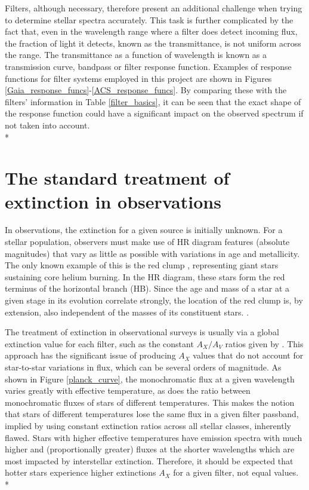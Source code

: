 \documentclass[12pt, a4paper]{report}
\begin{document}
Filters, although necessary, therefore present an additional challenge when trying to determine stellar spectra accurately. This task is further complicated by the fact that, even in the wavelength range where a filter does detect incoming flux, the fraction of light it detects, known as the transmittance, is not uniform across the range. The transmittance as a function of wavelength is known as a transmission curve, bandpass or filter response function. Examples of response functions for filter systems employed in this project are shown in Figures \ref{Gaia_response_funcs}-\ref{ACS_response_funcs}. By comparing these with the filters' information in Table \ref{filter_basics}, it can be seen that the exact shape of the response function could have a significant impact on the observed spectrum if not taken into account.\\*

\section{The standard treatment of extinction in observations}
In observations, the extinction for a given source is initially unknown. For a stellar population, observers must make use of HR diagram features (absolute magnitudes) that vary as little as possible with variations in age and metallicity. The only known example of this is the red clump \citep{1992ApJS...78..517C}, representing giant stars sustaining core helium burning. In the HR diagram, these stars form the red terminus of the horizontal branch (HB). Since the age and mass of a star at a given stage in its evolution correlate strongly, the location of the red clump is, by extension, also independent of the masses of its constituent stars. \cite{1998ApJ...494L.219P}.

The treatment of extinction in observational surveys is usually via a global extinction value for each filter, such as the constant $A_{X}/A_{V}$ ratios given by \cite{1985ApJ...288..618R}. This approach has the significant issue of producing $A_{X}$ values that do not account for star-to-star variations in flux, which can be several orders of magnitude. As shown in Figure \ref{planck_curve}, the monochromatic flux at a given wavelength varies greatly with effective temperature, as does the ratio between monochromatic fluxes of stars of different temperatures. This makes the notion that stars of different temperatures lose the same flux in a given filter passband, implied by using constant extinction ratios across all stellar classes, inherently flawed. Stars with higher effective temperatures have emission spectra with much higher and (proportionally greater) fluxes at the shorter wavelengths which are most impacted by interstellar extinction. Therefore, it should be expected that hotter stars experience higher extinctions $A_{X}$ for a given filter, not equal values.\\*
\end{document}
